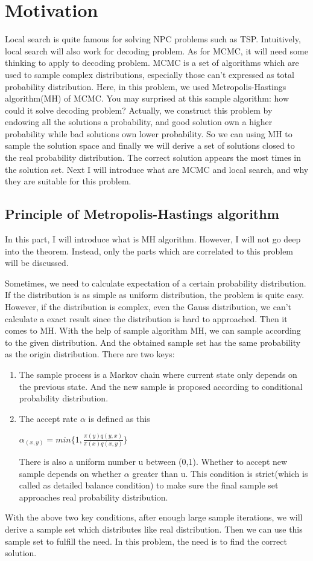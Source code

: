\documentclass{acmtog} %
\begin{document}
\section{Motivation}
Local search is quite famous for solving NPC problems such as TSP. Intuitively, local search will also work for decoding problem. As for MCMC, it will need some thinking to apply to decoding problem. MCMC is a set of algorithms which are used to sample complex distributions, especially those can't expressed as total probability distribution. Here, in this problem, we used Metropolis-Hastings algorithm(MH) of MCMC. You may surprised at this sample algorithm: how could it solve decoding problem? Actually, we construct this problem by endowing all the solutions a probability, and good solution own a higher probability while bad solutions own lower probability. So we can using MH to sample the solution space and finally we will derive a set of solutions closed to the real probability distribution. The correct solution appears the most times in the solution set. Next I will introduce what are MCMC and local search, and why they are suitable for this problem.
\subsection{Principle of Metropolis-Hastings algorithm}
In this part, I will introduce what is MH algorithm. However, I will not go deep into the theorem. Instead, only the parts which are correlated to this problem will be discussed.

Sometimes, we need to calculate expectation of a certain probability distribution. If the distribution is as simple as uniform distribution, the problem is quite easy. However, if the distribution is complex, even the Gauss distribution, we can't calculate a exact result since the distribution is hard to approached. Then it comes to MH. With the help of sample algorithm MH, we can sample according to the given distribution. And the obtained sample set has the same probability as the origin distribution. There are two keys:
\begin{enumerate}
    \item The sample process is a Markov chain where current state only depends on the previous state. And the new sample is proposed according to conditional probability distribution.
    \item The accept rate ${\alpha}$ is defined as this 
    \begin{center}
        ${\alpha }_{\left(x,y\right)}=min\{1,\frac{\pi \left(y\right)q\left(y,x\right)}{\pi \left(x\right)q\left(x,y\right)}\}$
    \end{center} There is also a uniform number u between (0,1). Whether to accept new sample depends on whether ${\alpha}$ greater than u. This condition is strict(which is called as detailed balance condition) to make sure the final sample set approaches real probability distribution.
\end{enumerate}
With the above two key conditions, after enough large sample iterations, we will derive a sample set which distributes like real distribution. Then we can use this sample set to fulfill the need. In this problem, the need is to find the correct solution.
\end{document}
